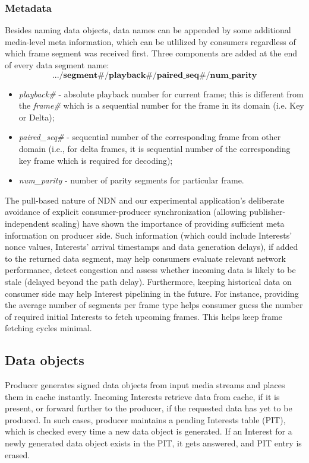 \documentclass{icn/sig-alternate-2012} %
\begin{document}
\subsubsection{Metadata} 

Besides naming data objects, data names can be appended by some additional media-level meta information, which can be utlilized by consumers regardless of which frame segment was received first. Three components are added at the end of every data segment name:
\small\begin{equation}
.../\textbf{segment\#}/\textbf{playback\#}/\textbf{paired\_seq\#}/\textbf{num\_parity} \nonumber
\end{equation}\normalsize
\begin{itemize}[label={}]
\item \textit{playback\#} - absolute playback number for current frame; this is different from the \textit{frame\#} which is a sequential number for the frame in its domain (i.e. Key or Delta);
\item \textit{paired\_seq\#} - sequential number of the corresponding frame from other domain (i.e., for delta frames, it is sequential number of the corresponding key frame which is required for decoding);
\item \textit{num\_parity} - number of parity segments for particular frame.
\end{itemize}

The pull-based nature of NDN and our experimental application's deliberate avoidance of explicit consumer-producer synchronization (allowing publisher-independent scaling) have shown the importance of providing sufficient meta information on producer side. Such information (which could include Interests' nonce values, Interests' arrival timestamps and data generation delays), if added to the returned data segment, may help consumers evaluate relevant network performance, detect congestion and assess whether incoming data is likely to be stale (delayed beyond the path delay). Furthermore, keeping historical data on consumer side may help Interest pipelining in the future. For instance, providing the average number of segments per frame type helps consumer guess the number of required initial Interests to fetch upcoming frames. This helps keep frame fetching cycles minimal.


\subsection{Data objects}
Producer generates signed data objects from input media streams and places them in cache instantly. Incoming Interests retrieve data from cache, if it is present, or forward further to the producer, if the requested data has yet to be produced. In such cases, producer maintains a pending Interests table (PIT), which is checked every time a new data object is generated. If an Interest for a newly generated data object exists in the PIT, it gets answered, and PIT entry is erased.
\end{document}
